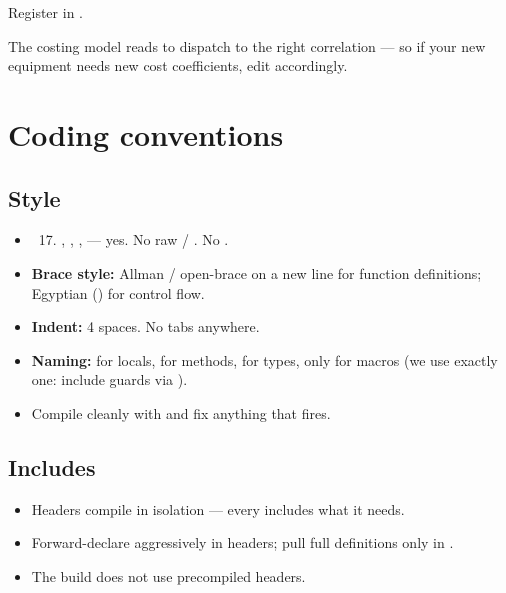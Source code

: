 \documentclass[11pt,a4paper]{article}
\begin{document}
Register in .

The  costing model reads  to
dispatch to the right correlation --- so if your new equipment needs
new cost coefficients, edit
 accordingly.

\section{Coding conventions}

\subsection{Style}

\begin{itemize}[leftmargin=*]
  \item \cpp{}~17. , ,
        ,  --- yes.
        No raw  / . No .
  \item \textbf{Brace style:} Allman / open-brace on a new line for
        function definitions; Egyptian () for control flow.
  \item \textbf{Indent:} 4 spaces. No tabs anywhere.
  \item \textbf{Naming:}  for locals, 
        for methods,  for types, 
        only for macros (we use exactly one: include guards via
        ).
  \item Compile cleanly with  and fix
        anything that fires.
\end{itemize}

\subsection{Includes}

\begin{itemize}[leftmargin=*,nosep]
  \item Headers compile in isolation --- every  includes what
        it needs.
  \item Forward-declare aggressively in headers; pull full definitions
        only in .
  \item The build does not use precompiled headers.
\end{itemize}
\end{document}
